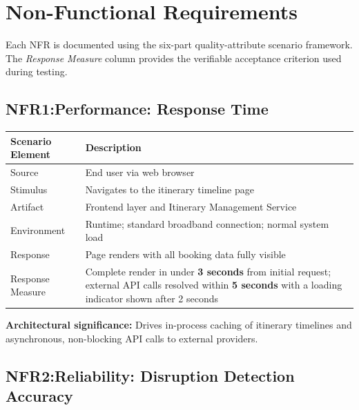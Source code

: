 \documentclass[12pt,a4paper]{article}
\begin{document}
\section{Non-Functional Requirements}

Each NFR is documented using the six-part quality-attribute scenario framework. The
\textit{Response Measure} column provides the verifiable acceptance criterion used during testing.

\subsection{NFR1:Performance: Response Time}

\begin{tabularx}{\textwidth}{L{3.5cm}X}
\toprule
\textbf{Scenario Element} & \textbf{Description} \\
\midrule
Source            & End user via web browser \\
Stimulus          & Navigates to the itinerary timeline page \\
Artifact          & Frontend layer and Itinerary Management Service \\
Environment       & Runtime; standard broadband connection; normal system load \\
Response          & Page renders with all booking data fully visible \\
Response Measure  & Complete render in under \textbf{3 seconds} from initial request; external API
                    calls resolved within \textbf{5 seconds} with a loading indicator shown after
                    2 seconds \\
\bottomrule
\end{tabularx}

\textbf{Architectural significance:} Drives in-process caching of itinerary timelines and
asynchronous, non-blocking API calls to external providers.

\vspace{1em}

\subsection{NFR2:Reliability: Disruption Detection Accuracy}
\end{document}
